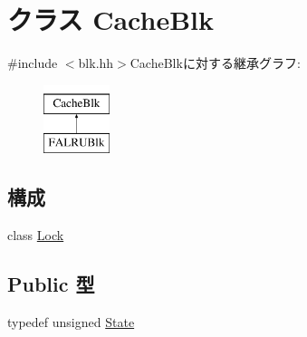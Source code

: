 \hypertarget{classCacheBlk}{
\section{クラス CacheBlk}
\label{classCacheBlk}
}


{\ttfamily \#include $<$blk.hh$>$}CacheBlkに対する継承グラフ:\begin{figure}[H]
\begin{center}
\leavevmode
\includegraphics[height=2cm]{classCacheBlk}
\end{center}
\end{figure}
\subsection*{構成}
\begin{DoxyCompactItemize}
\item 
class \hyperlink{classCacheBlk_1_1Lock}{Lock}
\end{DoxyCompactItemize}
\subsection*{Public 型}
\begin{DoxyCompactItemize}
\item 
typedef unsigned \hyperlink{classCacheBlk_a09dbc3a4ce615f45c897d9ee6fbffb2a}{State}
\end{DoxyCompactItemize}
